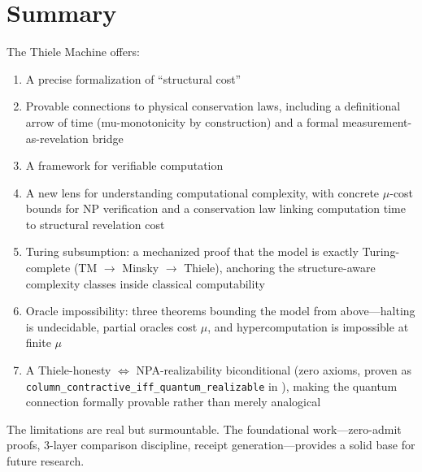 \section{Summary}

The Thiele Machine offers:
\begin{enumerate}
    \item A precise formalization of ``structural cost''
    \item Provable connections to physical conservation laws, including a definitional arrow of time (mu-monotonicity by construction) and a formal measurement-as-revelation bridge
    \item A framework for verifiable computation
    \item A new lens for understanding computational complexity, with concrete $\mu$-cost bounds for NP verification and a conservation law linking computation time to structural revelation cost
    \item Turing subsumption: a mechanized proof that the model is exactly Turing-complete (TM $\to$ Minsky $\to$ Thiele), anchoring the structure-aware complexity classes inside classical computability
    \item Oracle impossibility: three theorems bounding the model from above---halting is undecidable, partial oracles cost $\mu$, and hypercomputation is impossible at finite $\mu$
    \item A Thiele-honesty $\iff$ NPA-realizability biconditional (zero axioms, proven as \texttt{column\_contractive\_iff\_quantum\_realizable} in ), making the quantum connection formally provable rather than merely analogical
\end{enumerate}

The limitations are real but surmountable. The foundational work---zero-admit proofs, 3-layer comparison discipline, receipt generation---provides a solid base for future research.
